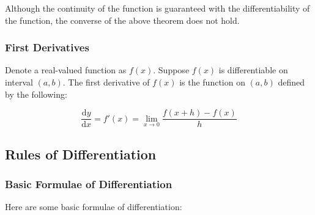 \documentclass[a4paper,12pt]{article}
\newcommand{\diff}{\mathrm{d}}
\begin{document}
Although the continuity of the function is guaranteed with the differentiability of the function, the converse of the above theorem does not hold.

\subsubsection{First Derivatives}
Denote a real-valued function as $f(x)$. Suppose $f(x)$ is differentiable on interval $(a,b)$. The first derivative of $f(x)$ is the function on $(a,b)$ defined by the following:

$$\frac{\diff  y}{\diff  x}=f'(x)=\lim_{x\to 0}\frac{f(x+h)-f(x)}{h}$$

\subsection{Rules of Differentiation}
\subsubsection{Basic Formulae of Differentiation}
Here are some basic formulae of differentiation:
\end{document}

